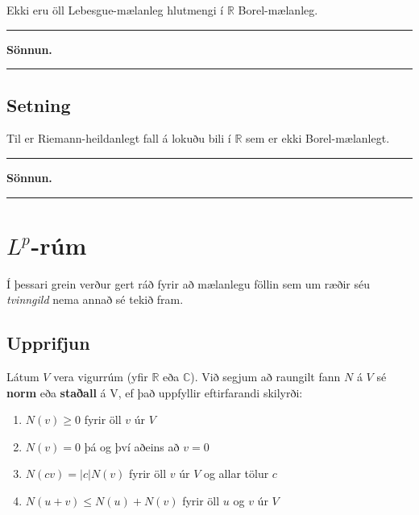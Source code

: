 \documentclass[]{book}
\providecommand{\tightlist}{%
  \setlength{\itemsep}{0pt}\setlength{\parskip}{0pt}}
\begin{document}
Ekki eru öll Lebesgue-mælanleg hlutmengi í \(\mathbb R\) Borel-mælanleg.

\begin{center}\rule{0.5\linewidth}{\linethickness}\end{center}

\textbf{Sönnun.}

\begin{center}\rule{0.5\linewidth}{\linethickness}\end{center}

\hypertarget{setning-65}{%
\section{Setning}\label{setning-65}}

Til er Riemann-heildanlegt fall á lokuðu bili í \(\mathbb R\) sem er ekki Borel-mælanlegt.

\begin{center}\rule{0.5\linewidth}{\linethickness}\end{center}

\textbf{Sönnun.}

\begin{center}\rule{0.5\linewidth}{\linethickness}\end{center}

\hypertarget{lp-rum}{%
\chapter{\texorpdfstring{\(L^p\)-rúm}{L\^{}p-rúm}}\label{lp-rum}}

Í þessari grein verður gert ráð fyrir að mælanlegu föllin sem um ræðir séu \emph{tvinngild} nema annað sé tekið fram.

\hypertarget{upprifjun}{%
\section*{Upprifjun}\label{upprifjun}}

Látum \(V\) vera vigurrúm (yfir \(\mathbb R\) eða \(\mathbb C\)). Við segjum að raungilt fann \(N\) á \(V\) sé \textbf{norm} eða \textbf{staðall} á V, ef það uppfyllir eftirfarandi skilyrði:

\begin{enumerate}
\def\labelenumi{\arabic{enumi}.}
\tightlist
\item
  \(N(v) \geq 0\) fyrir öll \(v\) úr \(V\)
\item
  \(N(v) = 0\) þá og því aðeins að \(v = 0\)
\item
  \(N(cv) = |c|N(v)\) fyrir öll \(v\) úr \(V\) og allar tölur \(c\)
\item
  \(N(u + v) \leq N(u) + N(v)\) fyrir öll \(u\) og \(v\) úr \(V\)
\end{enumerate}
\end{document}
